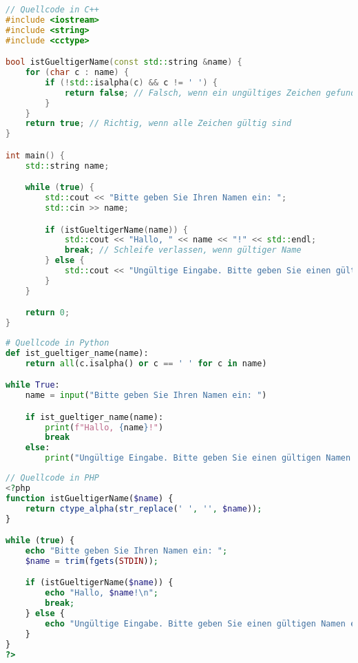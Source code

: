 \documentclass[12pt,a4paper]{scrartcl}
\begin{document}
\begin{lstlisting}[language={C++}]
// Quellcode in C++
#include <iostream>
#include <string>
#include <cctype>

bool istGueltigerName(const std::string &name) {
    for (char c : name) {
        if (!std::isalpha(c) && c != ' ') {
            return false; // Falsch, wenn ein ungültiges Zeichen gefunden wird
        }
    }
    return true; // Richtig, wenn alle Zeichen gültig sind
}

int main() {
    std::string name;

    while (true) {
        std::cout << "Bitte geben Sie Ihren Namen ein: ";
        std::cin >> name;

        if (istGueltigerName(name)) {
            std::cout << "Hallo, " << name << "!" << std::endl;
            break; // Schleife verlassen, wenn gültiger Name
        } else {
            std::cout << "Ungültige Eingabe. Bitte geben Sie einen gültigen Namen ein." << std::endl;
        }
    }

    return 0;
}
\end{lstlisting}

\begin{lstlisting}[language=Python]
# Quellcode in Python
def ist_gueltiger_name(name):
    return all(c.isalpha() or c == ' ' for c in name)

while True:
    name = input("Bitte geben Sie Ihren Namen ein: ")

    if ist_gueltiger_name(name):
        print(f"Hallo, {name}!")
        break
    else:
        print("Ungültige Eingabe. Bitte geben Sie einen gültigen Namen ein.")
\end{lstlisting}

\begin{lstlisting}[language=PHP]
// Quellcode in PHP
<?php
function istGueltigerName($name) {
    return ctype_alpha(str_replace(' ', '', $name));
}

while (true) {
    echo "Bitte geben Sie Ihren Namen ein: ";
    $name = trim(fgets(STDIN));

    if (istGueltigerName($name)) {
        echo "Hallo, $name!\n";
        break;
    } else {
        echo "Ungültige Eingabe. Bitte geben Sie einen gültigen Namen ein.\n";
    }
}
?>
\end{lstlisting}
\end{document}
